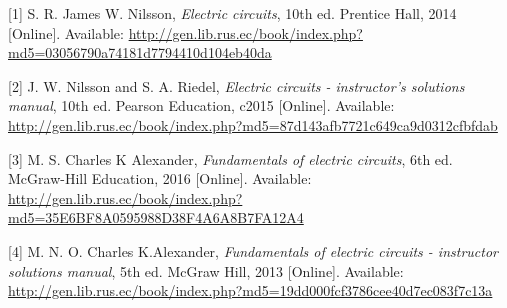 \hypertarget{ref-book:nilEC}{}
{[}1{]} S. R. James W. Nilsson, \emph{Electric circuits}, 10th ed.
Prentice Hall, 2014 {[}Online{]}. Available:
\url{http://gen.lib.rus.ec/book/index.php?md5=03056790a74181d7794410d104eb40da}

\hypertarget{ref-book:nilECSol}{}
{[}2{]} J. W. Nilsson and S. A. Riedel, \emph{Electric circuits -
instructor's solutions manual}, 10th ed. Pearson Education, c2015
{[}Online{]}. Available:
\url{http://gen.lib.rus.ec/book/index.php?md5=87d143afb7721c649ca9d0312cfbfdab}

\hypertarget{ref-book:alexEC}{}
{[}3{]} M. S. Charles K Alexander, \emph{Fundamentals of electric
circuits}, 6th ed. McGraw-Hill Education, 2016 {[}Online{]}. Available:
\url{http://gen.lib.rus.ec/book/index.php?md5=35E6BF8A0595988D38F4A6A8B7FA12A4}

\hypertarget{ref-book:alexECSol}{}
{[}4{]} M. N. O. Charles K.Alexander, \emph{Fundamentals of electric
circuits - instructor solutions manual}, 5th ed. McGraw Hill, 2013
{[}Online{]}. Available:
\url{http://gen.lib.rus.ec/book/index.php?md5=19dd000fcf3786cee40d7ec083f7c13a}
